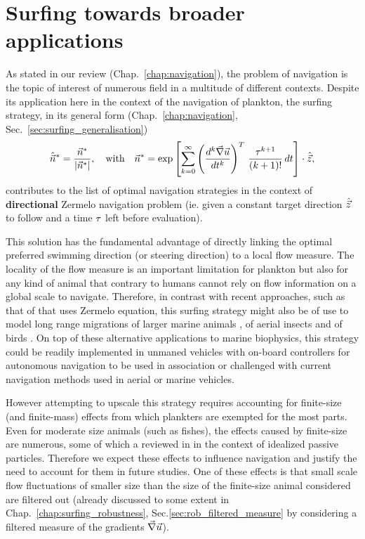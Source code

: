 \section{Surfing towards broader applications}

As stated in our review (Chap.~\ref{chap:navigation}), the problem of navigation is the topic of interest of numerous field in a multitude of different contexts.
Despite its application here in the context of the navigation of plankton, the surfing strategy, in its general form (Chap.~\ref{chap:navigation}, Sec.~\ref{sec:surfing_generalisation})
\begin{equation}
	\hat{\vec{n}}^* = \frac{\vec{n}^*}{\lvert\vec{n}^*\rvert}, \quad \text{with} \quad \vec{n}^* = \exp \left[ \sum_{k=0}^\infty \left( \frac{d^k \vec{\nabla} \vec{u}}{dt^k} \right)^T \, \frac{\tau^{k+1}}{(k+1)!} \, dt \right] \cdot \hat{\vec{z}},
\end{equation}
contributes to the list of optimal navigation strategies in the context of \textbf{directional} Zermelo navigation problem (ie. given a constant target direction $\hat{\vec{z}}$ to follow and a time $\tau$ left before evaluation).

This solution has the fundamental advantage of directly linking the optimal preferred swimming direction (or steering direction) to a local flow measure.
The locality of the flow measure is an important limitation for plankton but also for any kind of animal that contrary to humans cannot rely on flow information on a global scale to navigate.
Therefore, in contrast with recent approaches, such as that of \citet{hays2014route} that uses Zermelo equation, this surfing strategy might also be of use to model long range migrations of larger marine animals \citep{fossette2015current, putman2014inherited, luschi2013long, hays2014route}, of aerial insects \citep{chapman2015long} and of birds \citep{wehner2001bird}.
On top of these alternative applications to marine biophysics, this strategy could be readily implemented in unmaned vehicles with on-board controllers for autonomous navigation to be used in association or challenged with current navigation methods used in aerial \citep{reddy2018glider} or marine \citep{tranzatto2015navigation} vehicles.

However attempting to upscale this strategy requires accounting for finite-size (and finite-mass) effects from which plankters are exempted for the most parts.
Even for moderate size animals (such as fishes), the effects caused by finite-size are numerous, some of which a reviewed in \citet{brandt2022particle} in the context of idealized passive particles.
Therefore we expect these effects to influence navigation and justify the need to account for them in future studies.
One of these effects is that small scale flow fluctuations of smaller size than the size of the finite-size animal considered are filtered out (already discussed to some extent in Chap.~\ref{chap:surfing_robustness}, Sec.\ref{sec:rob_filtered_measure} by considering a filtered measure of the gradients $\vec{\nabla} \vec{u}$).


